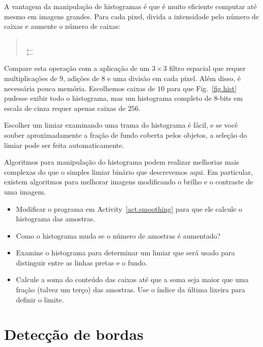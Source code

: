 A vantagem da manipulação de histogramas é que é muito eficiente computar até mesmo em imagens grandes. Para cada pixel, divida a intensidade pelo número de caixas e aumente o número de caixas:
\begin{quote}
\\
\hspace*{2em} $\leftarrow$ \\
\hspace*{2em} $\leftarrow$ 
\end{quote}
Compare esta operação com a aplicação de um $3\times 3$ filtro espacial que requer multiplicações de $9$, adições de $8$ e uma divisão em cada pixel. Além disso, é necessária pouca memória. Escolhemos caixas de $10$ para que Fig.~\ref{fig.hist} pudesse exibir todo o histograma, mas um histograma completo de $8$-bits em escala de cinza requer apenas caixas de $256$.

Escolher um limiar examinando uma trama do histograma é fácil, e se você souber aproximadamente a fração de fundo coberta pelos objetos, a seleção do limiar pode ser feita automaticamente.

Algoritmos para manipulação do histograma podem realizar melhorias mais complexas do que o simples limiar binário que descrevemos aqui. Em particular, existem algoritmos para melhorar imagens modificando o brilho e o contraste de uma imagem. 

\begin{framed}
\begin{itemize}
\item Modificar o programa em Activity~\ref{act.smoothing} para que ele calcule o histograma das amostras.
\item Como o histograma muda se o número de amostras é aumentado?
\item Examine o histograma para determinar um limiar que será usado para distinguir entre as linhas pretas e o fundo.
\item Calcule a soma do conteúdo das caixas até que a soma seja maior que uma fração (talvez um terço) das amostras. Use o índice da última lixeira para definir o limite.
\end{itemize}
\end{framed}

\section{Detecção de bordas}\label{s.edge-detection}

